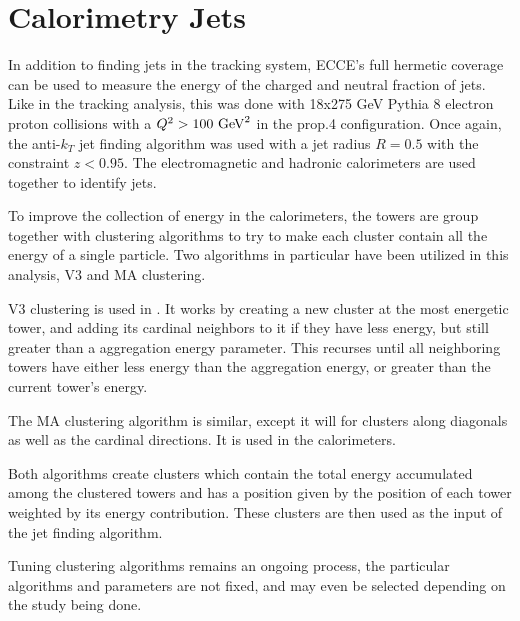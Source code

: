 \section{Calorimetry Jets}
\label{calo_jets}

In addition to finding jets in the tracking system, ECCE's full hermetic coverage can be used to measure the energy of the charged and neutral fraction of jets.  Like in the tracking analysis, this was done with 18x275 GeV Pythia 8 electron proton collisions with a $Q^2>100\hbox{ GeV}^2$ in the prop.4 configuration.  Once again, the anti-$k_T$ jet finding algorithm was used with a jet radius $R=0.5$ with the constraint $z<0.95$.  The electromagnetic and hadronic calorimeters are used together to identify jets.

To improve the collection of energy in the calorimeters, the towers are group together with clustering algorithms to try to make each cluster contain all the energy of a single particle.  Two algorithms in particular have been utilized in this analysis, V3 and MA clustering.

V3 clustering is used in .  It works by creating a new cluster at the most energetic tower, and adding its cardinal neighbors to it if they have less energy, but still greater than a aggregation energy parameter.  This recurses until all neighboring towers have either less energy than the aggregation energy, or greater than the current tower's energy.

The MA clustering algorithm is similar, except it will for clusters along diagonals as well as the cardinal directions.  It is used in the  calorimeters.  

Both algorithms create clusters which contain the total energy accumulated among the clustered towers and has a position given by the position of each tower weighted by its energy contribution.  These clusters are then used as the input of the jet finding algorithm.  

Tuning clustering algorithms remains an ongoing process, the particular algorithms and parameters are not fixed, and may even be selected depending on the study being done. 


